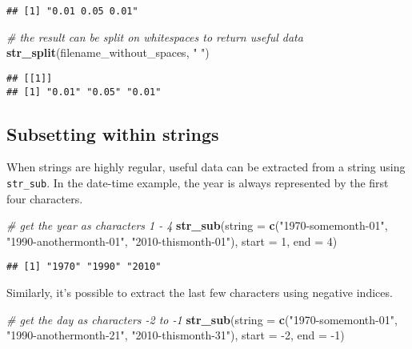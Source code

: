 \documentclass[
]{book}
\newenvironment{Shaded}{}{}
\newcommand{\CommentTok}[1]{\textcolor[rgb]{0.38,0.63,0.69}{\textit{#1}}}
\newcommand{\DataTypeTok}[1]{\textcolor[rgb]{0.56,0.13,0.00}{#1}}
\newcommand{\DecValTok}[1]{\textcolor[rgb]{0.25,0.63,0.44}{#1}}
\newcommand{\KeywordTok}[1]{\textcolor[rgb]{0.00,0.44,0.13}{\textbf{#1}}}
\newcommand{\NormalTok}[1]{#1}
\newcommand{\StringTok}[1]{\textcolor[rgb]{0.25,0.44,0.63}{#1}}
\begin{document}
\begin{verbatim}
## [1] "0.01 0.05 0.01"
\end{verbatim}

\begin{Shaded}
\begin{Highlighting}[]
\CommentTok{# the result can be split on whitespaces to return useful data}
\KeywordTok{str_split}\NormalTok{(filename_without_spaces, }\StringTok{" "}\NormalTok{)}
\end{Highlighting}
\end{Shaded}

\begin{verbatim}
## [[1]]
## [1] "0.01" "0.05" "0.01"
\end{verbatim}

\hypertarget{subsetting-within-strings}{%
\subsection{Subsetting within strings}\label{subsetting-within-strings}}

When strings are highly regular, useful data can be extracted from a string using \texttt{str\_sub}. In the date-time example, the year is always represented by the first four characters.

\begin{Shaded}
\begin{Highlighting}[]
\CommentTok{# get the year as characters 1 - 4}
\KeywordTok{str_sub}\NormalTok{(}\DataTypeTok{string =} \KeywordTok{c}\NormalTok{(}\StringTok{"1970-somemonth-01"}\NormalTok{,}
                   \StringTok{"1990-anothermonth-01"}\NormalTok{,}
                   \StringTok{"2010-thismonth-01"}\NormalTok{),}
        \DataTypeTok{start =} \DecValTok{1}\NormalTok{, }\DataTypeTok{end =} \DecValTok{4}\NormalTok{)}
\end{Highlighting}
\end{Shaded}

\begin{verbatim}
## [1] "1970" "1990" "2010"
\end{verbatim}

Similarly, it's possible to extract the last few characters using negative indices.

\begin{Shaded}
\begin{Highlighting}[]
\CommentTok{# get the day as characters -2 to -1}
\KeywordTok{str_sub}\NormalTok{(}\DataTypeTok{string =} \KeywordTok{c}\NormalTok{(}\StringTok{"1970-somemonth-01"}\NormalTok{,}
                   \StringTok{"1990-anothermonth-21"}\NormalTok{,}
                   \StringTok{"2010-thismonth-31"}\NormalTok{),}
        \DataTypeTok{start =} \DecValTok{-2}\NormalTok{, }\DataTypeTok{end =} \DecValTok{-1}\NormalTok{)}
\end{Highlighting}
\end{Shaded}
\end{document}
